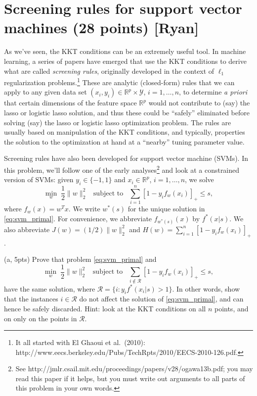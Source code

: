 \documentclass{article}
\theoremstyle{remark}
\theoremstyle{definition}
\newcommand{\st}{\mathop{\mathrm{subject\,\,to}}}
\def\R{\mathbb{R}}
\begin{document}
\section{Screening rules for support vector machines (28 points) [Ryan]}

As we've seen, the KKT conditions can be an extremely useful tool.  In machine
learning, a series of papers have emerged that use the KKT conditions to derive
what are called {\it screening rules}, originally developed in the context of
$\ell_1$ regularization
problems.\footnote{It all started with El Ghaoui et al.\ (2010):
  http://www.eecs.berkeley.edu/Pubs/TechRpts/2010/EECS-2010-126.pdf.} 
These are analytic (closed-form) rules that we can apply to any given data set
$(x_i,y_i) \in \R^p \times \mathcal{Y}$, $i=1,\ldots,n$, to determine {\it a 
  priori} that certain dimensions of the feature space $\R^p$ would not
contribute to (say) the lasso or logistic lasso solution, and thus these could
be ``safely'' eliminated before solving (say) the lasso or logistic lasso
optimization problem.  The rules are usually based on manipulation of the KKT
conditions, and typically, properties the solution to the optimization at hand
at a ``nearby'' tuning parameter value.

Screening rules have also been developed for support vector machine (SVMs).  In  
this problem, we'll follow one of the early
analyses\footnote{See
  http://jmlr.csail.mit.edu/proceedings/papers/v28/ogawa13b.pdf; you may read
  this paper if it helps, but you must write out arguments to all parts of this
  problem in your own words.}
and look at a constrained version of SVMs: given $y_i \in 
\{-1,1\}$ and $x_i \in \R^p$, $i=1,\ldots,n$, we solve
\begin{equation}
\label{eq:svm_primal}
\min_w \; \frac{1}{2}\|w\|_2^2 \;\; \st \;\; 
\sum_{i=1}^n [1 - y_i f_w(x_i)]_+ \leq s, 
\end{equation}
where $f_w(x) = w^Tx$.  We write $w^*(s)$ for the unique solution in
\eqref{eq:svm_primal}.  For convenience, we abbreviate $f_{w^*(s)}(x)$ by 
$f^*(x|s)$.  We also abbreviate $J(w)=(1/2) \|w\|_2^2$ and $H(w)=\sum_{i=1}^n [1 
- y_i f_w(x_i)]_+$.  
 
\bigskip
\noindent
(a, 5pts) Prove that problem \eqref{eq:svm_primal} and 
$$
\min_w \; \frac{1}{2}\|w\|_2^2 \;\; \st \;\;
\sum_{i\notin\mathcal{R}} [1 - y_i f_w(x_i)]_+ \leq s, 
$$
have the same solution, where $\mathcal{R} = \{i  : y_i f^*(x_i|s)>1 
\}$. In other words, show that the instances $i\in\mathcal{R}$ do not 
affect the solution of \eqref{eq:svm_primal}, and can hence be safely 
discarded. Hint: look at the KKT conditions on all $n$ points, and on only on
the points in $\mathcal{R}$.  
\end{document}
